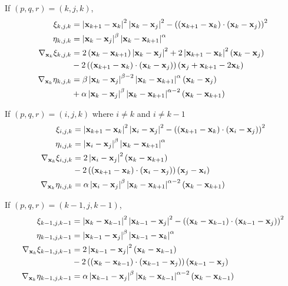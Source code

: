 \documentclass[../dissertation.tex]{subfiles}
\begin{document}
If $\left( p,q,r \right) = \left( k,j,k \right)$,
\begin{align*}
        \xi_{k,j,k} &= \left| \mathbf{x}_{k+1} - \mathbf{x}_k \right|^2 \left| \mathbf{x}_k - \mathbf{x}_j \right|^2- \left( \left( \mathbf{x}_{k+1} - \mathbf{x}_{k} \right) \cdot \left( \mathbf{x}_{k} - \mathbf{x}_{j} \right) \right)^2 \\
        \eta_{k,j,k} &= \left| \mathbf{x}_k - \mathbf{x}_j \right|^{\beta} \left| \mathbf{x}_k - \mathbf{x}_{k+1} \right|^{\alpha} \\
        \nabla_{\mathbf{x}_k} \xi_{k,j,k} &= 2\left( \mathbf{x}_k - \mathbf{x}_{k+1} \right) \left| \mathbf{x}_k - \mathbf{x}_j \right|^2
    + 2 \left| \mathbf{x}_{k+1} - \mathbf{x}_k \right|^2 \left( \mathbf{x}_k - \mathbf{x}_j \right) \\
    &- 2 \left(\left( \mathbf{x}_{k+1} - \mathbf{x}_k \right) \cdot \left( \mathbf{x}_k - \mathbf{x}_j \right)\right) \left( \mathbf{x}_j + \mathbf{x}_{k+1} - 2 \mathbf{x}_k \right) \\
    \nabla_{\mathbf{x}_k} \eta_{k,j,k} &= \beta \left| \mathbf{x}_k - \mathbf{x}_j \right|^{\beta - 2} \left| \mathbf{x}_k - \mathbf{x}_{k+1} \right|^{\alpha} \left( \mathbf{x}_k - \mathbf{x}_j \right)\\
    &+ \alpha \left| \mathbf{x}_k - \mathbf{x}_j \right|^{\beta} \left| \mathbf{x}_k - \mathbf{x}_{k+1} \right|^{\alpha - 2} \left( \mathbf{x}_k - \mathbf{x}_{k+1} \right)
\end{align*}

If $\left( p,q,r \right) = \left( i,j,k \right)$ where $i \neq k$ and $i \neq k-1$
\begin{align*}
    \xi_{i,j,k} &= \left| \mathbf{x}_{k+1} - \mathbf{x}_k \right|^2 \left| \mathbf{x}_i - \mathbf{x}_j \right|^2- \left( \left( \mathbf{x}_{k+1} - \mathbf{x}_{k} \right) \cdot \left( \mathbf{x}_{i} - \mathbf{x}_{j} \right) \right)^2 \\
    \eta_{i,j,k} &= \left| \mathbf{x}_i - \mathbf{x}_j \right|^{\beta} \left| \mathbf{x}_k - \mathbf{x}_{k+1} \right|^{\alpha} \\
    \nabla_{\mathbf{x}_k} \xi_{i,j,k} &= 2 \left| \mathbf{x}_i - \mathbf{x}_j \right|^2 \left( \mathbf{x}_k - \mathbf{x}_{k+1} \right) \\
    &- 2 \left(\left( \mathbf{x}_{k+1} - \mathbf{x}_k \right) \cdot \left( \mathbf{x}_i - \mathbf{x}_j \right)\right) \left( \mathbf{x}_j - \mathbf{x}_i \right) \\
    \nabla_{\mathbf{x}_k} \eta_{i,j,k} &= \alpha \left| \mathbf{x}_i - \mathbf{x}_j \right|^{\beta} \left| \mathbf{x}_k - \mathbf{x}_{k+1} \right|^{\alpha - 2} \left( \mathbf{x}_k - \mathbf{x}_{k+1} \right)
\end{align*}

If $\left( p,q,r \right) = \left( k-1,j,k-1 \right)$,
\begin{align*}
    \xi_{k-1,j,k-1} &= \left| \mathbf{x}_k - \mathbf{x}_{k-1} \right|^2 \left| \mathbf{x}_{k-1} - \mathbf{x}_j \right|^2- \left( \left( \mathbf{x}_k - \mathbf{x}_{k-1} \right) \cdot \left( \mathbf{x}_{k-1} - \mathbf{x}_{j} \right) \right)^2 \\
    \eta_{k-1,j,k-1} &= \left| \mathbf{x}_{k-1} - \mathbf{x}_j \right|^{\beta} \left| \mathbf{x}_{k-1} - \mathbf{x}_k \right|^{\alpha} \\
    \nabla_{\mathbf{x}_k} \xi_{k-1,j,k-1} &= 2 \left| \mathbf{x}_{k-1} - \mathbf{x}_j \right|^2 \left( \mathbf{x}_k - \mathbf{x}_{k-1} \right) \\
    &- 2 \left( \left( \mathbf{x}_k - \mathbf{x}_{k-1} \right) \cdot \left( \mathbf{x}_{k-1} - \mathbf{x}_j \right)\right) \left( \mathbf{x}_{k-1} - \mathbf{x}_j \right) \\
    \nabla_{\mathbf{x}_k} \eta_{k-1,j,k-1} &= \alpha \left| \mathbf{x}_{k-1} - \mathbf{x}_j \right|^{\beta} \left| \mathbf{x}_k - \mathbf{x}_{k-1} \right|^{\alpha-2} \left( \mathbf{x}_k - \mathbf{x}_{k-1} \right)
\end{align*}
\end{document}
